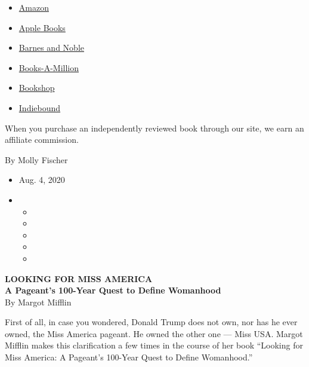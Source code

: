 \begin{itemize}
\tightlist
\item
  \href{https://www.amazon.com/gp/search?index=books\&tag=NYTBSREV-20\&field-keywords=Looking+for+Miss+America\%3A+A+Pageant\%27s+100-Year+Quest+to+Define+Womanhood+Margot+Mifflin}{Amazon}
\item
  \href{https://du-gae-books-dot-nyt-du-prd.appspot.com/buy?title=Looking+for+Miss+America\%3A+A+Pageant\%27s+100-Year+Quest+to+Define+Womanhood\&author=Margot+Mifflin}{Apple
  Books}
\item
  \href{https://www.anrdoezrs.net/click-7990613-11819508?url=https\%3A\%2F\%2Fwww.barnesandnoble.com\%2Fw\%2F\%3Fean\%3D9781640092235}{Barnes
  and Noble}
\item
  \href{https://www.anrdoezrs.net/click-7990613-35140?url=https\%3A\%2F\%2Fwww.booksamillion.com\%2Fp\%2FLooking\%2Bfor\%2BMiss\%2BAmerica\%253A\%2BA\%2BPageant\%2527s\%2B100-Year\%2BQuest\%2Bto\%2BDefine\%2BWomanhood\%2FMargot\%2BMifflin\%2F9781640092235}{Books-A-Million}
\item
  \href{https://bookshop.org/a/3546/9781640092235}{Bookshop}
\item
  \href{https://www.indiebound.org/book/9781640092235?aff=NYT}{Indiebound}
\end{itemize}

When you purchase an independently reviewed book through our site, we
earn an affiliate commission.

By Molly Fischer

\begin{itemize}
\item
  Aug. 4, 2020
\item
  \begin{itemize}
  \item
  \item
  \item
  \item
  \item
  \end{itemize}
\end{itemize}

\textbf{LOOKING FOR MISS AMERICA}\\
\textbf{A Pageant's 100-Year Quest to Define Womanhood}\\
By Margot Mifflin

First of all, in case you wondered, Donald Trump does not own, nor has
he ever owned, the Miss America pageant. He owned the other one --- Miss
USA. Margot Mifflin makes this clarification a few times in the course
of her book ``Looking for Miss America: A Pageant's 100-Year Quest to
Define Womanhood.''

